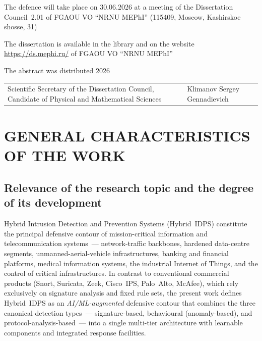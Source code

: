 \documentclass[12pt,a5paper]{article}
\begin{document}
{\vspace{0.2cm}

\noindent The defence will take place on 30.06.2026 at a meeting of the Dissertation Council~2.01 of FGAOU VO ``NRNU MEPhI'' (115409, Moscow, Kashirskoe shosse, 31)

\vspace{0.15cm}

\noindent The dissertation is available in the library and on the website \url{https://ds.mephi.ru/} of FGAOU VO ``NRNU MEPhI''

\vspace{0.15cm}

\noindent The abstract was distributed \underline{\hspace{2.5cm}} 2026

\vspace{0.3cm}

\noindent\begin{tabular}{@{}p{4.5cm}p{2cm}p{3.5cm}@{}}
Scientific Secretary of the Dissertation Council, Candidate of Physical and Mathematical Sciences & & Klimanov Sergey Gennadievich \\
\end{tabular}
}

\newpage

\setcounter{page}{3}

\section*{GENERAL CHARACTERISTICS OF THE WORK}

\subsection*{Relevance of the research topic and the degree of its development}

Hybrid Intrusion Detection and Prevention Systems (Hybrid~IDPS)
constitute the principal defensive contour of mission-critical
information and telecommunication systems~--- network-traffic
backbones, hardened data-centre segments, unmanned-aerial-vehicle
infrastructures, banking and financial platforms, medical
information systems, the industrial Internet of Things, and
the control of critical infrastructures. In contrast to
conventional commercial products (Snort, Suricata, Zeek,
Cisco~IPS, Palo~Alto, McAfee), which rely exclusively on
signature analysis and fixed rule sets, the present work
defines Hybrid~IDPS as an \emph{AI/ML-augmented} defensive
contour that combines the three canonical detection types~---
signature-based, behavioural (anomaly-based), and
protocol-analysis-based~--- into a single multi-tier
architecture with learnable components and integrated response
facilities.
\end{document}
